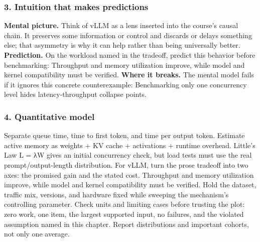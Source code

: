 \subsubsection*{3. Intuition that makes predictions}
\textbf{Mental picture.} Think of vLLM as a lens inserted into the course's causal chain. It preserves some information or control and discards or delays something else; that asymmetry is why it can help rather than being universally better.
\textbf{Prediction.} On the workload named in the tradeoff, predict this behavior before benchmarking: Throughput and memory utilization improve, while model and kernel compatibility must be verified.
\textbf{Where it breaks.} The mental model fails if it ignores this concrete counterexample: Benchmarking only one concurrency level hides latency-throughput collapse points.
\subsubsection*{4. Quantitative model}
Separate queue time, time to first token, and time per output token. Estimate active memory as weights + KV cache + activations + runtime overhead. Little's Law L = λW gives an initial concurrency check, but load tests must use the real prompt/output-length distribution.
For vLLM, turn the prose tradeoff into two axes: the promised gain and the stated cost. Throughput and memory utilization improve, while model and kernel compatibility must be verified. Hold the dataset, traffic mix, versions, and hardware fixed while sweeping the mechanism's controlling parameter.
Check units and limiting cases before trusting the plot: zero work, one item, the largest supported input, no failures, and the violated assumption named in this chapter. Report distributions and important cohorts, not only one average.
